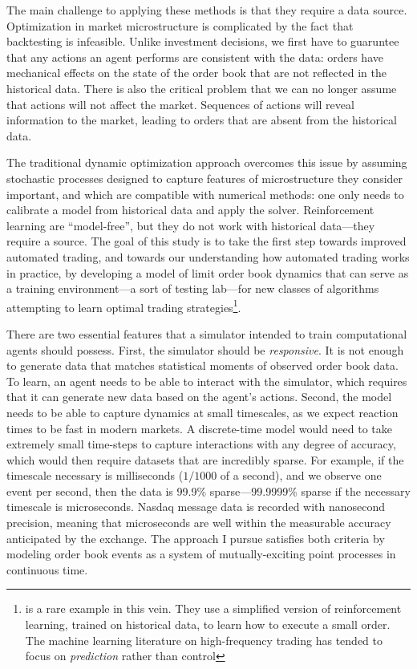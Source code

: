 	The main challenge to applying these methods is that they require a data source. Optimization in market microstructure is complicated by the fact that backtesting is infeasible. Unlike investment decisions, we first have to guaruntee that any actions an agent performs are consistent with the data: orders have mechanical effects on the state of the order book that are not reflected in the historical data. There is also the critical problem that we can no longer assume that actions will not affect the market. Sequences of actions will reveal information to the market, leading to orders that are absent from the historical data.

	The traditional dynamic optimization approach overcomes this issue by assuming stochastic processes designed to capture features of microstructure they consider important, and which are compatible with numerical methods: one only needs to calibrate a model from historical data and apply the solver. Reinforcement learning are ``model-free'', but they do not work with historical data---they require a source. The goal of this study is to take the first step towards improved automated trading, and towards our understanding how automated trading works in practice, by developing a model of limit order book dynamics that can serve as a training environment---a sort of testing lab---for new classes of algorithms attempting to learn optimal trading strategies\footnote{\cite{Nevmyvaka2006} is a rare example in this vein. They use a simplified version of reinforcement learning, trained on historical data, to learn how to execute a small order. The machine learning literature on high-frequency trading has tended to focus on \textit{prediction} rather than control}.

	There are two essential features that a simulator intended to train computational agents should possess. First, the simulator should be \textit{responsive}. It is not enough to generate data that matches statistical moments of observed order book data. To learn, an agent needs to be able to interact with the simulator, which requires that it can generate new data based on the agent's actions. Second, the model needs to be able to capture dynamics at small timescales, as we expect reaction times to be fast in modern markets. A discrete-time model would need to take extremely small time-steps to capture interactions with any degree of accuracy, which would then require datasets that are incredibly sparse. For example, if the timescale necessary is milliseconds ($1/1000$ of a second), and we observe one event per second, then the data is 99.9\% sparse---99.9999\% sparse if the necessary timescale is microseconds. Nasdaq message data is recorded with nanosecond precision, meaning that microseconds are well within the measurable accuracy anticipated by the exchange. The approach I pursue satisfies both criteria by modeling order book events as a system of mutually-exciting point processes in continuous time.

